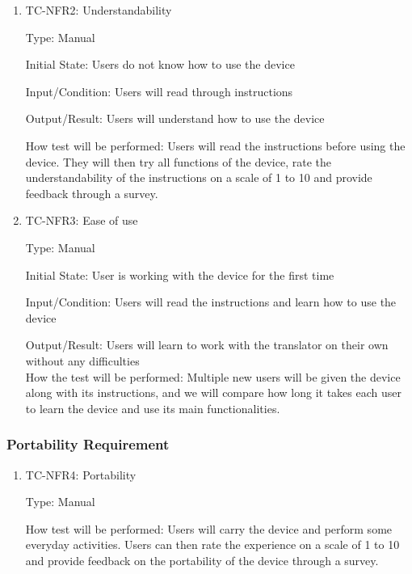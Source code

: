 \documentclass[12pt]{article}
\begin{document}
\begin{enumerate}

\item{TC-NFR2: Understandability\\}

Type: Manual
					
Initial State: Users do not know how to use the device
					
Input/Condition: Users will read through instructions
					
Output/Result: Users will understand how to use the device
					
How test will be performed: Users will read the instructions before using the device. They will then try all functions of the device, rate the understandability of the instructions on a scale of 1 to 10 and provide feedback through a survey.

\item{TC-NFR3: Ease of use\\}

Type: Manual
					
Initial State: User is working with the device for the first time
					
Input/Condition: Users will read the instructions and learn how to use the device
					
Output/Result: Users will learn to work with the translator on their own without any difficulties\\
How the test will be performed: Multiple new users will be given the device along with its instructions, and we will compare how long it takes each user to learn the device and use its main functionalities.
					


\end{enumerate}

\subsubsection{Portability Requirement}

\begin{enumerate}

\item{TC-NFR4: Portability\\}

Type: Manual
					
How test will be performed: Users will carry the device and perform some everyday activities. Users can then rate the experience on a scale of 1 to 10 and provide feedback on the portability of the device through a survey.

\end{enumerate}
\end{document}

